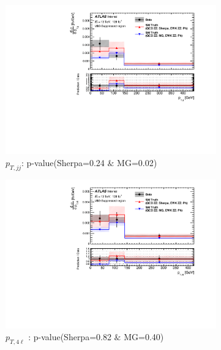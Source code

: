 \begin{figure}[!htb]
\begin{subfigure}{.49\textwidth}
        \centering
        \includegraphics[width=.98\linewidth]{figures/Results/CrossSection_VBSSuppressed/xs_ptjj_CR.pdf}
        \caption{ \footnotesize{$p_{T,jj}$}: p-value(Sherpa=0.24 $\&$ MG=0.02)}
    \end{subfigure}
    \begin{subfigure}{.49\textwidth}
        \centering
        \includegraphics[width=.98\linewidth]{figures/Results/CrossSection_VBSSuppressed/xs_pt4l_CR.pdf}
        \caption{ \footnotesize{$p_{T,4\ell}$ }: p-value(Sherpa=0.82 $\&$ MG=0.40)}
    \end{subfigure}\\
    \begin{subfigure}{.49\textwidth}
        \centering

\end{subfigure}
\end{figure}
